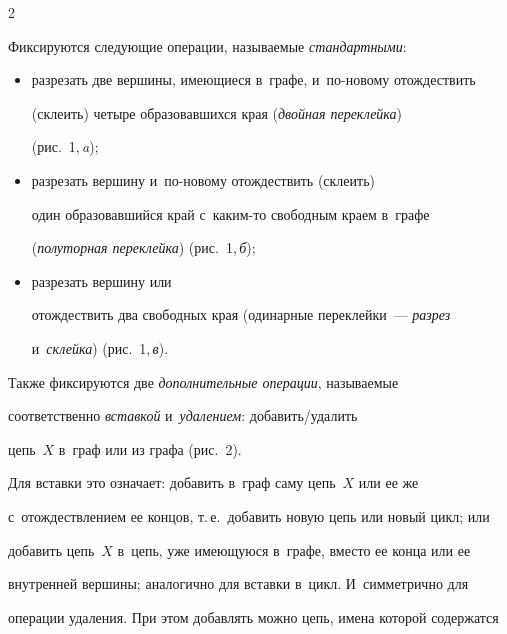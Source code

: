 \begin{multicols}{2}
  


   Фиксируются следующие операции, на\-зы\-ва\-емые \textit{стандартными}:


   \begin{itemize} 


\item разрезать две вершины, имеющиеся в~графе, и~по-но\-во\-му отождествить 


(склеить) четыре образовавшихся края (\textit{двойная переклейка}) 


(рис.~1,\,\textit{a});


\item разрезать вершину и~по-но\-во\-му отождествить (склеить) 


один образовавшийся край с~ка\-ким-то свободным краем в~графе 


(\textit{полуторная переклейка}) (рис.~1,\,\textit{б}); 


\item разрезать вершину или 


отождествить два свободных края (одинарные переклейки~--- \textit{разрез} 


и~\textit{склейка}) (рис.~1,\,\textit{в}).


\end{itemize}


  





  


  Также фиксируются две \textit{дополнительные операции}, называемые 


соответственно \textit{вставкой} и~\textit{удалением}: до\-ба\-вить/уда\-лить 


цепь~$X$ в~граф или из графа (рис.~2).


  





  


  Для вставки это означает: добавить в~граф саму цепь~$X$ или ее же 


с~отождествлением ее концов, т.\,е.\ добавить новую цепь или новый цикл; или 


добавить цепь~$X$ в~цепь, уже имеющуюся в~графе, вместо ее конца или ее 


внутренней вершины; аналогично для вставки в~цикл. И~симметрично для 


операции удаления. При этом добавлять можно цепь, имена которой содержатся 



\end{multicols}
